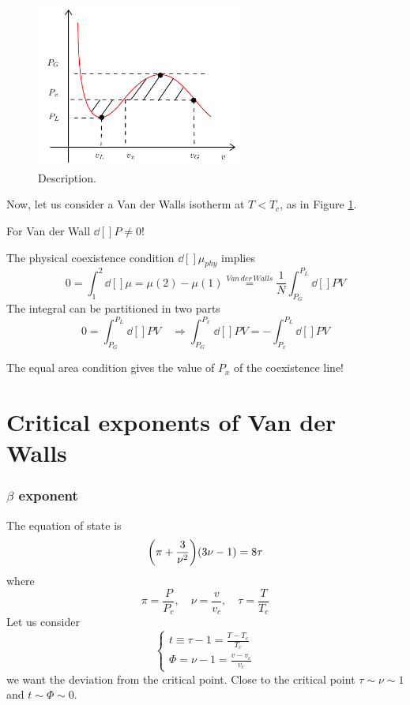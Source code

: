 \documentclass[../main/main.tex]{subfiles}
\begin{document}
\begin{figure}[h!]
\centering
\includegraphics[width=0.6\textwidth]{../lessons/14_image/5.pdf}
\caption{\label{fig:14_4} Description.}
\end{figure}

Now, let us consider a Van der Walls isotherm at \( T < T_c \), as in Figure \ref{fig:14_4}.
\begin{remark}
For Van der Wall \( \dd[]{P} \neq 0  \)!
\end{remark}
The physical coexistence condition \( \dd[]{\mu }_{phy}  \) implies
\begin{equation}
  0 = \int_{1}^{2} \dd[]{\mu } = \mu (2) - \mu (1) \overset{Van\, der\, Walls}{=} \frac{1}{N} \int_{P_G}^{P_L} \dd[]{P} V
\end{equation}
The integral can be partitioned in two parts
\begin{equation}
  0 = \int_{P_G}^{P_L} \dd[]{P}V \quad \Rightarrow \int_{P_G}^{P_x} \dd[]{P}V = - \int_{P_x}^{P_L} \dd[]{P} V
\end{equation}
\begin{remark}
The equal area condition gives the value of \( P_x \) of the coexistence line!
\end{remark}



\section{Critical exponents of Van der Walls}

\subsubsection{\( \beta  \) exponent}
The equation of state is
\begin{equation}
  \qty(\pi + \frac{3}{\nu ^2}) \qty(3 \nu - 1) = 8 \tau
\end{equation}
where
\begin{equation}
  \pi = \frac{P}{P_c}, \quad \nu = \frac{v }{v_c}, \quad \tau = \frac{T}{T_c}
\end{equation}
Let us consider
\begin{equation}
  \begin{cases}
   t \equiv \tau -1 = \frac{T-T_c}{T_c} \\
   \Phi = \nu -1 = \frac{v-v_c}{v_c}
  \end{cases}
\end{equation}
we want the deviation from the critical point.
Close to the critical point \( \tau \sim \nu \sim 1 \) and \( t \sim \Phi \sim 0 \).
\end{document}
